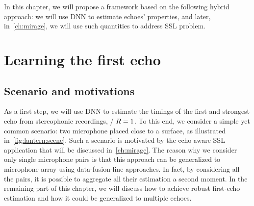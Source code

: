 
\mynewline
In this chapter, we will propose a framework based on the following hybrid approach:
we will use \ac{DNN} to estimate echoes' properties, and later, in~\cref{ch:mirage}, we will use such quantities to address \ac{SSL} problem.

\section{Learning the first echo}\label{sec:lantern:simple}

\subsection{Scenario and motivations}
As a first step, we will use \ac{DNN} to estimate the timings of the first and strongest echo from stereophonic recordings, \ie/ $R=1$.
To this end, we consider a simple yet common scenario: two microphone placed close to a surface, as illustrated in~\cref{fig:lantern:scene}.
Such a scenario is motivated by the echo-aware \acf{SSL} application that will be discussed in~\cref{ch:mirage}.
The reason why we consider only single microphone pairs is that this approach can be generalized to microphone array using data-fusion-line approaches.
In fact, by considering all the pairs, it is possible to aggregate all their estimation a second moment.
In the remaining part of this chapter, we will discuss how to achieve robust first-echo estimation and how it could be generalized to multiple echoes.

